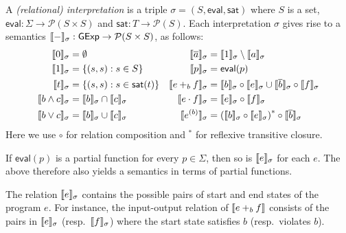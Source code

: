 \documentclass[orivec,envcountsect,envcountsame]{llncs}
\begin{document}
    \begin{definition}%
    \label{def:relational interpretation}
    A \emph{(relational) interpretation} is a triple $\sigma = (S, \mathsf{eval}, \mathsf{sat})$ where $S$ is a set, $\mathsf{eval}: \Sigma \to \mathcal{P}(S \times S)$ and $\mathsf{sat}: T \to \mathcal{P}(S)$.
    Each interpretation \(\sigma\) gives rise to a semantics $\llbracket-\rrbracket_\sigma: \mathsf{GExp} \to \mathcal{P}(S \times S)$, as follows:
    \begin{align*}
    \llbracket0\rrbracket_\sigma &= \emptyset
        & \llbracket\overline{a}\rrbracket_\sigma &= \llbracket1\rrbracket_\sigma \setminus \llbracket a\rrbracket_\sigma \\
    \llbracket1\rrbracket_\sigma &= \{ (s, s) : s \in S \}
        & \llbracket p\rrbracket_\sigma &= \mathsf{eval}(p) \\
    \llbracket t\rrbracket_\sigma &= \{ (s, s) : s \in \mathsf{sat}(t) \}
        & \llbracket e +_b f\rrbracket_\sigma &= \llbracket b\rrbracket_\sigma \circ \llbracket e\rrbracket_\sigma \cup \llbracket\overline{b}\rrbracket_\sigma \circ \llbracket f\rrbracket_\sigma \\
    \llbracket b \wedge c\rrbracket_\sigma &= \llbracket b\rrbracket_\sigma \cap \llbracket c\rrbracket_\sigma
        & \llbracket e \cdot f\rrbracket_\sigma &= \llbracket e\rrbracket_\sigma \circ \llbracket f\rrbracket_\sigma \\
    \llbracket b \vee c\rrbracket_\sigma &= \llbracket b\rrbracket_\sigma \cup \llbracket c\rrbracket_\sigma
        & \llbracket e^{(b)}\rrbracket_\sigma &= {(\llbracket b\rrbracket_\sigma \circ \llbracket e\rrbracket_\sigma)}^* \circ \llbracket\overline{b}\rrbracket_\sigma
    \end{align*}
    Here we use \(\circ\) for relation composition and ${}^*$ for reflexive transitive closure.
    \end{definition}

    \begin{remark}
    If $\mathsf{eval}(p)$ is a partial function for every $p \in \Sigma$, then so is $\llbracket e\rrbracket_\sigma$ for each $e$.
    The above therefore also yields a semantics in terms of partial functions.
    \end{remark}

    The relation $\llbracket e\rrbracket_\sigma$ contains the possible pairs of start and end states of the program $e$.
    For instance, the input-output relation of $\llbracket e +_b f\rrbracket$ consists of the pairs in $\llbracket e\rrbracket_\sigma$ (resp.\ $\llbracket f\rrbracket_\sigma$) where the start state satisfies $b$ (resp.\ violates $b$).
\end{document}
